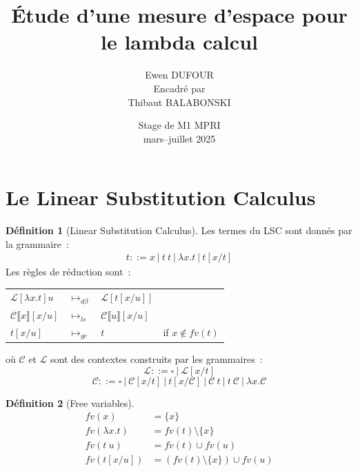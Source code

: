 \documentclass[11pt,a4paper]{article}
\title{Étude d'une mesure d'espace pour le lambda calcul}
\author{Ewen DUFOUR\\[1ex]
{\small Encadré par}\\ {\small Thibaut BALABONSKI}}
\date{Stage de M1 MPRI\\mars--juillet 2025}
\theoremstyle{definition}
\newtheorem{definition}{Définition}[section]
\newcommand{\mcc}{\mathcal{C}}
\newcommand{\mcl}{\mathcal{L}}
\begin{document}
\maketitle

%
\section{Le Linear Substitution Calculus}

\begin{definition}[Linear Substitution Calculus]
Les termes du LSC sont donnés par la grammaire~:
\begin{align*}
    t ::= x~|~t~t~|~\lambda x.t~|~t[x / t]
\end{align*}
Les règles de réduction sont~:
\begin{center}
\begin{tabular}{l l l l }
  $\mcl[\lambda x.t]u$ &$\mapsto_{d\beta}$ &$\mcl[t[x / u]]$ & \\
$\mathcal{C}\llbracket x \rrbracket [x / u]$ &$\mapsto_{ls}$ &$\mathcal{C}\llbracket u \rrbracket [x / u]$ & \\
$t[x / u]$ &$\mapsto_{gc}$ &$t$ & if $x\notin fv(t)$
\end{tabular}
\end{center}
où $\mcc$ et $\mcl$ sont des contextes construits par les grammaires~:
\[\mcl ::= \square~|~\mcl[x/t]\]
\[\mcc ::= \square~|~\mcc[x/t]~|~t[x/\mcc]~|~\mcc~t~|~t~\mcc~|~\lambda x.\mcc\]  
\end{definition}
\begin{definition}[Free variables]
\begin{align*}
    fv(x) &= \{ x \} \\
    fv(\lambda x.t) &= fv(t) \setminus \{ x \} \\
    fv(t~u) &= fv(t) \cup fv(u) \\
    fv(t[x/u]) &= (fv(t) \setminus \{ x \}) \cup fv(u) \\
\end{align*}
\end{definition}
\end{document}
